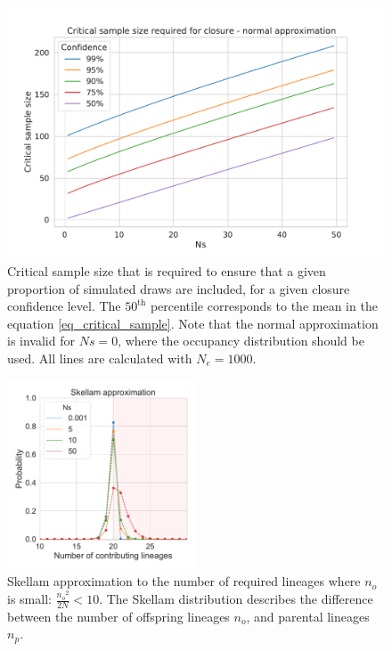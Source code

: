 \documentclass[review]{elsarticle}
\begin{document}
\begin{figure}[H]
  \centering
  \includegraphics[width=\textwidth]{fig/critical_normal.pdf}
  \caption{Critical sample size that is required to ensure that a given proportion of simulated
  draws are included, for a given closure confidence level. The
    $50^\text{th}$ percentile corresponds to the mean in the equation \eqref{eq_critical_sample}. Note that the
    normal approximation is invalid for $Ns=0$, where the occupancy distribution should be used. All
    lines are calculated with $N_e=1000$.}
  \label{fig_apx_critical_normal}
\end{figure}

\begin{figure}[H]
  \centering
  \includegraphics[width=0.5\textwidth]{fig/skellam.pdf}
  \caption{Skellam approximation to the number of required lineages where $n_o$ is small:
  $\frac{{n_o}^2}{2N} < 10$. The Skellam distribution describes the difference between the number
  of offspring lineages $n_o$, and parental lineages $n_p$. }
  \label{fig_apx_skellam}
\end{figure}
\end{document}
